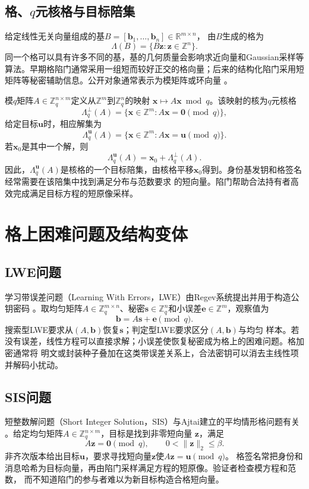 \begin{mathchapterlayout}
\subsection{格、$q$元核格与目标陪集}

给定线性无关向量组成的基$B=[\mathbf b_1,\ldots,\mathbf b_n]\in\mathbb R^{m\times n}$，
由$B$生成的格为
\[
  \Lambda(B)=\{B\mathbf z:\mathbf z\in\mathbb Z^n\}.
\]
同一个格可以具有许多不同的基，基的几何质量会影响求近向量和Gaussian采样等算法。早期格陷门通常采用一组短而较好正交的格向量；后来的结构化陷门采用短矩阵等秘密辅助信息。公开对象通常表示为模矩阵或环向量
\cite{gpv2008,micciancio2012trapdoors}。

模$q$矩阵$A\in\mathbb Z_q^{n\times m}$定义从$\mathbb Z^m$到$\mathbb Z_q^n$的映射
$\mathbf x\mapsto A\mathbf x\bmod q$。该映射的核为$q$元核格
\[
 \Lambda_q^\perp(A)=\{\mathbf x\in\mathbb Z^m:A\mathbf x=\mathbf0\pmod q\},
\]
给定目标$\mathbf u$时，相应解集为
\[
 \Lambda_q^{\mathbf u}(A)=\{\mathbf x\in\mathbb Z^m:A\mathbf x=\mathbf u\pmod q\}.
\]
若$\mathbf x_0$是其中一个解，则
\[
 \Lambda_q^{\mathbf u}(A)=\mathbf x_0+\Lambda_q^\perp(A).
\]
因此，$\Lambda_q^{\mathbf u}(A)$是核格的一个目标陪集，由核格平移$\mathbf x_0$得到。身份基发钥和格签名经常需要在该陪集中找到满足分布与范数要求
的短向量。陷门帮助合法持有者高效完成满足目标方程的短原像采样。

\section{格上困难问题及结构变体}

\subsection{LWE问题}

学习带误差问题（Learning With Errors，LWE）由Regev系统提出并用于构造公钥密码
\cite{regev2005lwe}。取均匀矩阵$A\in\mathbb Z_q^{m\times n}$、秘密$\mathbf s\in\mathbb
Z_q^n$和小误差$\mathbf e\in\mathbb Z^m$，观察值为
\[
  \mathbf b=A\mathbf s+\mathbf e\pmod q.
\]
搜索型LWE要求从$(A,\mathbf b)$恢复$\mathbf s$；判定型LWE要求区分$(A,\mathbf b)$与均匀
样本。若没有误差，线性方程可以直接求解；小误差使恢复秘密成为格上的困难问题。格加密通常将
明文或封装种子叠加在这类带误差关系上，合法密钥可以消去主线性项并解码小扰动。

\subsection{SIS问题}

短整数解问题（Short Integer Solution，SIS）与Ajtai建立的平均情形格问题有关
\cite{ajtai1996}。给定均匀矩阵$A\in\mathbb Z_q^{n\times m}$，目标是找到非零短向量
$\mathbf z$，满足
\[
 A\mathbf z=\mathbf0\pmod q,
 \qquad 0<\lVert\mathbf z\rVert_2\leq\beta.
\]
非齐次版本给出目标$\mathbf u$，要求寻找短向量$\mathbf z$使$A\mathbf z=\mathbf u\pmod q$。
格签名常把身份和消息哈希为目标向量，再由陷门采样满足方程的短原像。验证者检查模方程和范数，
而不知道陷门的参与者难以为新目标构造合格短向量。


\end{mathchapterlayout}
